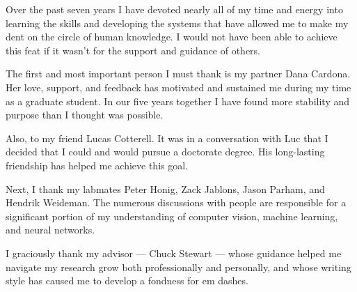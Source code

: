 \documentclass[chap]{thesis}
\author{Jonathan P. Crall
}
\begin{document}
\newcommand{\fnote}[1]{ (#1)}
\ifpublishversion{}
    \newcommand{\devcomment}[1]{}
    \newcommand{\chuckcomment}[1]{}
    \newcommand{\caplbl}[1]{}
\else
    \newcommand{\caplbl}[1]{\red(#1)\black\xspace}
    \newcommand{\devcomment}[1]{\marginpar{\scriptsize{\darkgreen{}\textbf{#1}\black{}}}}
    \newcommand{\chuckcomment}[1]{\marginpar{\scriptsize{\chuckblue{}\textbf{#1}\black{}}}}
\fi




\titlepagefinaldraft{}

\tableofcontents{}        

\listoftables{}          %
\listoffigures{}         %


Over the past seven years I have devoted nearly all of my time and energy into learning the skills and developing
  the systems that have allowed me to make my dent on the circle of human knowledge.
I would not have been able to achieve this feat if it wasn't for the support and guidance of others.

The first and most important person I must thank is my partner Dana Cardona.
Her love, support, and feedback has motivated and sustained me during my time as a graduate student.
In our five years together I have found more stability and purpose than I thought was possible.

Also, to my friend Lucas Cotterell.
It was in a conversation with Luc that I decided that I could and would pursue a doctorate degree.
His long-lasting friendship has helped me achieve this goal.

Next, I thank my labmates Peter Honig, Zack Jablons, Jason Parham, and Hendrik Weideman.
The numerous discussions with people are responsible for a significant portion of my understanding of computer
  vision, machine learning, and neural networks.

I graciously thank my advisor --- Chuck Stewart --- whose guidance helped me navigate my research grow both
  professionally and personally, and whose writing style has caused me to develop a fondness for em dashes.
\end{document}
